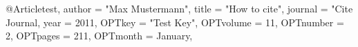 @Article{test,
author = {"Max Mustermann"},
title = {"How to cite"},
journal = {"Cite Journal},
year = {2011},
OPTkey = {"Test Key"},
OPTvolume = {11},
OPTnumber = {2},
OPTpages = {211},
OPTmonth = {January},
}
